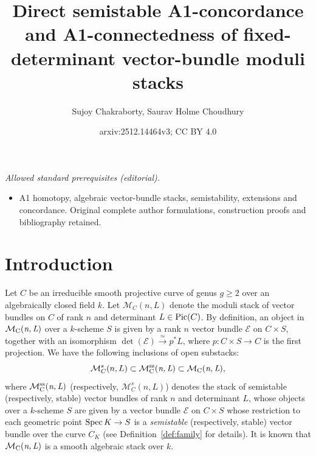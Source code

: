\documentclass[12pt,reqno]{amsart}
\title{Direct semistable A1-concordance and A1-connectedness of fixed-determinant vector-bundle moduli stacks}
\author{Sujoy Chakraborty, Saurav Holme Choudhury}
\date{arxiv:2512.14464v3; CC BY 4.0}
\DeclareMathOperator{\Pic}{\textnormal{Pic}}
\DeclareMathOperator{\mnl}{\mc{M}_C(\textit{n,\,L})}
\DeclareMathOperator{\mnlss}{\mc{M}^{ss}_C(\textit{n,\,L})}
\newcommand{\mc}[1]{\mathcal{#1}}
\theoremstyle{definition}
\numberwithin{equation}{section}
\begin{document}
\maketitle
\noindent\textit{Allowed standard prerequisites (editorial).}\begin{itemize}
\item A1 homotopy, algebraic vector-bundle stacks, semistability, extensions and concordance. Original complete author formulations, construction proofs and bibliography retained.
\end{itemize}\medskip
	\section{Introduction}
	
	Let $C$ be an irreducible smooth projective curve of genus $g\geq 2$ over
	an algebraically closed field $k$. Let $\mc{M}_C(n,L)$ denote the moduli
	stack of vector bundles on $C$ of rank $n$ and determinant $L\in \Pic(C)$.
	By definition, an object in $\mnl$ over a $k$-scheme $S$ is given by a rank
	$n$ vector bundle $\mc{E}$ on $C\times S$, together with an isomorphism
	$\det(\mc{E})\overset{\simeq}{\longrightarrow}p^*L$, where
	$p: C\times S \longrightarrow C$ is the first projection. We have the
	following inclusions of open substacks:
	\[
	\mc{M}^s_C(n,L)\subset \mnlss\subset\mnl,
	\]
	where $\mnlss$ (respectively, $\mc{M}^s_C(n,L)$) denotes the stack of
	semistable (respectively, stable) vector bundles of rank $n$ and determinant
	$L$, whose objects over a $k$-scheme $S$ are given by a vector bundle
	$\mc{E}$ on $C\times S$ whose restriction to each geometric point
	$\textnormal{Spec}\,K\rightarrow S$ is a \textit{semistable} (respectively,
	stable) vector bundle over the curve $C_K$ (see Definition~\ref{def:family}
	for details). It is known that $\mnl$ is a smooth algebraic stack over $k$.
	
\end{document}
